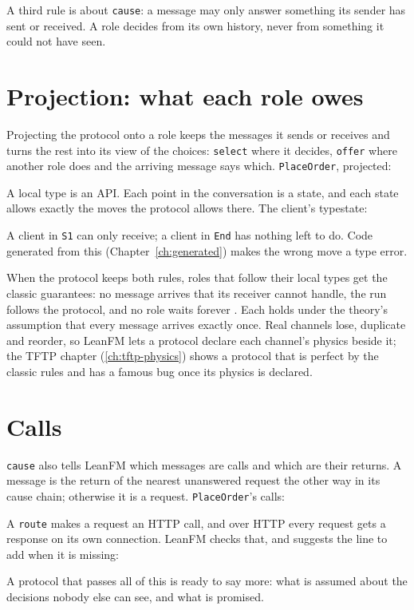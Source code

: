 A third rule is about \texttt{cause}: a message may only answer something its
sender has sent or received. A role decides from its own history, never from
something it could not have seen.

\section{Projection: what each role owes}

Projecting the protocol onto a role keeps the messages it sends or receives and
turns the rest into its view of the choices: \texttt{select} where it decides,
\texttt{offer} where another role does and the arriving message says which.
\texttt{PlaceOrder}, projected:



A local type is an API. Each point in the conversation is a state, and each state
allows exactly the moves the protocol allows there. The client's typestate:



A client in \texttt{S1} can only receive; a client in \texttt{End} has nothing
left to do. Code generated from this (Chapter~\ref{ch:generated}) makes the wrong
move a type error.

When the protocol keeps both rules, roles that follow their local types get the
classic guarantees: no message arrives that its receiver cannot handle, the run
follows the protocol, and no role waits forever
\citep{honda2008multiparty}. Each holds under the theory's assumption that every
message arrives exactly once. Real channels lose, duplicate and reorder, so
LeanFM lets a protocol declare each channel's physics beside it; the TFTP chapter
(\ref{ch:tftp-physics}) shows a protocol that is perfect by the classic rules and
has a famous bug once its physics is declared.

\section{Calls}

\texttt{cause} also tells LeanFM which messages are calls and which are their
returns. A message is the return of the nearest unanswered request the other way
in its cause chain; otherwise it is a request. \texttt{PlaceOrder}'s calls:



A \texttt{route} makes a request an HTTP call, and over HTTP every request gets a
response on its own connection. LeanFM checks that, and suggests the line to add
when it is missing:





A protocol that passes all of this is ready to say more: what is assumed about
the decisions nobody else can see, and what is promised.
